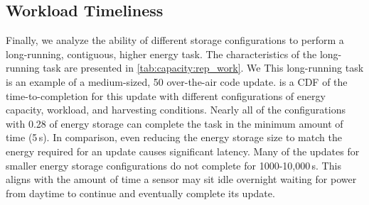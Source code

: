 \subsection{Workload Timeliness}
Finally, we analyze the ability of different storage configurations to perform a 
long-running, contiguous, higher energy task. 
The characteristics of the long-running task are presented in \cref{tab:capacity:rep_work}. We 
This long-running task is an example of a medium-sized, 50\ssi{\kilo\byte} over-the-air code update.
 is a CDF of the time-to-completion for this update with different configurations of energy capacity, workload, and harvesting conditions.
Nearly all of the configurations with
0.28\ssi{\milli\Wh} of energy storage can complete the task in the minimum amount of time (5\,s). In comparison,
even reducing the energy storage size to match the energy
required for an update causes significant latency. 
Many of the updates for smaller energy storage configurations
do not complete for 1000-10,000\,s.
This aligns with the amount of time a sensor may sit
idle overnight waiting for power from daytime to continue and eventually complete its update.



